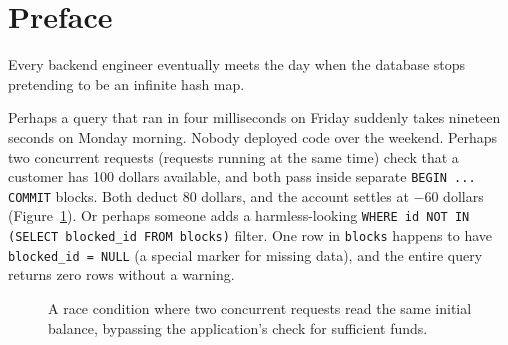 \chapter*{Preface}

Every backend engineer eventually meets the day when the database stops pretending to be an infinite hash map.

Perhaps a query that ran in four milliseconds on Friday suddenly takes nineteen seconds on Monday morning. Nobody deployed code over the weekend. Perhaps two concurrent requests (requests running at the same time) check that a customer has 100 dollars available, and both pass inside separate \texttt{BEGIN ... COMMIT} blocks. Both deduct 80 dollars, and the account settles at $-60$ dollars (Figure~\ref{fig:race_condition}). Or perhaps someone adds a harmless-looking \texttt{WHERE id NOT IN (SELECT blocked\_id FROM blocks)} filter. One row in \texttt{blocks} happens to have \texttt{blocked\_id = NULL} (a special marker for missing data), and the entire query returns zero rows without a warning.

\begin{figure}[htbp]
\centering
{}
\caption{A race condition where two concurrent requests read the same initial balance, bypassing the application's check for sufficient funds.}
\label{fig:race_condition}
\end{figure}

